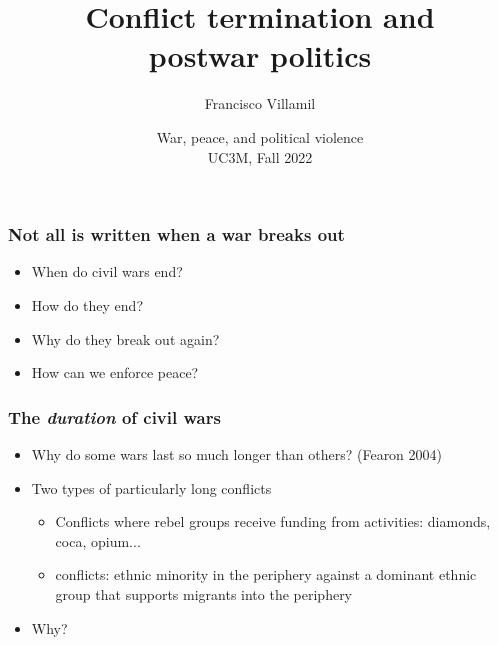\documentclass[aspectratio=43]{beamer}
\title{\huge Conflict termination and\\postwar politics}
\author{Francisco Villamil}
\date{War, peace, and political violence\\UC3M, Fall 2022}
\begin{document}
\begin{frame}
  \titlepage
\end{frame}

\begin{frame}
\frametitle{Not all is written when a war breaks out}
\centering

\begin{itemize}[<+->]
  \item When do civil wars end?
  \item How do they end?
  \item Why do they break out again?
  \item How can we enforce peace?
\end{itemize}

\end{frame}

\begin{frame}
\frametitle{The \textit{duration} of civil wars}
\centering

\begin{itemize}[<+->]
  \item Why do some wars last so much longer than others? {\scriptsize (Fearon 2004)}
  \item Two types of particularly long conflicts
  \begin{itemize}
    \item Conflicts where rebel groups receive funding from {\color{red}{contraband}} activities: diamonds, coca, opium...
    \item {\color{red}{`Sons-of-the-soil'}} conflicts: ethnic minority in the periphery against a dominant ethnic group that supports migrants into the periphery
  \end{itemize}
  \item Why?
\end{itemize}

\end{frame}
\end{document}
